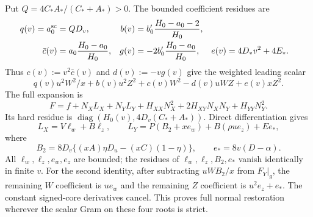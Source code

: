 Put $Q=4C_*A_* /(C_*+A_*)>0$.  The bounded coefficient residues are
\begin{align*}
 q(v)=a_0^{\rm sc}&=Q D_v,&
 b(v)&=b_0'\frac{H_0-a_0-2}{H_0},\\
 \bar c(v)&=a_0\frac{H_0-a_0}{H_0},&
 g(v)&=-2b_0'\frac{H_0-a_0}{H_0},&
 e(v)&=4D_*v^2+4E_*.
\end{align*}
Thus $c(v):=v^2\bar c(v)$ and $d(v):=-vg(v)$ give the weighted
leading scalar
\[
 q(v)u^2W^2/x+b(v)u^2Z^2+c(v)W^2-d(v)uWZ+e(v)xZ^2.
\]
The full expansion is
\[
 F=f+N_XL_X+N_YL_Y+H_{XX}N_X^2+2H_{XY}N_XN_Y+H_{YY}N_Y^2.
\]
Its hard residue is $\operatorname{diag}(H_0(v),4D_v(C_*+A_*))$.
Direct differentiation gives
\[
 L_X=V\ell_w+B\ell_z,\qquad
 L_Y=P(B_2+xe_w)+B(\rho u e_z)+E e_*,
\]
where
\[
 B_2=8D_v\{(xA)\eta D_u-(xC)(1-\eta)\},\qquad
 e_*=8v(D-\alpha).
\]
All $\ell_w,\ell_z,e_w,e_z$ are bounded; the residues of
$\ell_w,\ell_z,B_2,e_*$ vanish identically in finite $v$.
For the second identity, after subtracting $uWB_2/x$ from $F_Y|_g$,
the remaining $W$ coefficient is $ue_w$ and the remaining $Z$
coefficient is $u^2e_z+e_*$.  The constant signed-core derivatives
cancel.  This proves full normal restoration wherever the scalar
Gram on these four roots is strict.

